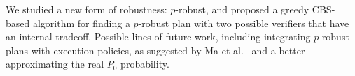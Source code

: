 \documentclass{article}
\begin{document}
We studied a new form of robustness: $p$-robust, and proposed a greedy CBS-based algorithm for finding a $p$-robust plan with two possible verifiers that have an internal tradeoff. Possible lines of future work, including integrating $p$-robust plans with execution policies, as suggested by Ma et al.~ and a better approximating the real $P_0$ probability.








\end{document}
